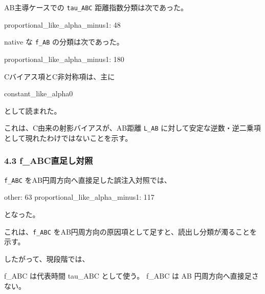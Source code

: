 \documentclass[
]{article}
\newenvironment{Shaded}{}{}
\newcommand{\NormalTok}[1]{#1}
\begin{document}
AB主導ケースでの \texttt{tau\_ABC} 距離指数分類は次であった。

\begin{Shaded}
\begin{Highlighting}[]
\NormalTok{proportional\_like\_alpha\_minus1: 48}
\end{Highlighting}
\end{Shaded}

native な \texttt{f\_AB} の分類は次であった。

\begin{Shaded}
\begin{Highlighting}[]
\NormalTok{proportional\_like\_alpha\_minus1: 180}
\end{Highlighting}
\end{Shaded}

Cバイアス項とC非対称項は、主に

\begin{Shaded}
\begin{Highlighting}[]
\NormalTok{constant\_like\_alpha0}
\end{Highlighting}
\end{Shaded}

として読まれた。

これは、C由来の射影バイアスが、AB距離 \texttt{L\_AB}
に対して安定な逆数・逆二乗項として現れたわけではないことを示す。

\subsubsection{4.3
f\_ABC直足し対照}\label{f_abcux76f4ux8db3ux3057ux5bfeux7167}

\texttt{f\_ABC} をAB円周方向へ直接足した誤注入対照では、

\begin{Shaded}
\begin{Highlighting}[]
\NormalTok{other: 63}
\NormalTok{proportional\_like\_alpha\_minus1: 117}
\end{Highlighting}
\end{Shaded}

となった。

これは、\texttt{f\_ABC}
をAB円周方向の原因項として足すと、読出し分類が濁ることを示す。

したがって、現段階では、

\begin{Shaded}
\begin{Highlighting}[]
\NormalTok{f\_ABC は代表時間 tau\_ABC として使う。}
\NormalTok{f\_ABC は AB 円周方向へ直接足さない。}
\end{Highlighting}
\end{Shaded}
\end{document}
